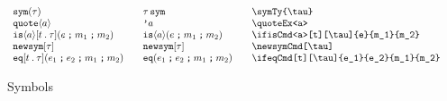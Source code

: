 \documentclass[11pt]{article}
\begin{document}
\begin{figure}
  
  \begin{small}
    \begin{displaymath}
      \begin{array}{l@{\qquad}l@{\qquad}l@{\qquad}l}
        \symTy{\tau}               & \symTy*{\tau}              & \verb|\symTy{\tau}|                \\
        \quoteEx<a>                & \quoteEx*<a>               & \verb|\quoteEx<a>|                 \\
        \ifisCmd<a>[t][\tau]{e}{m_1}{m_2} & \ifisCmd*<a>{e}{m_1}{m_2}  & \verb|\ifisCmd<a>[t][\tau]{e}{m_1}{m_2}| \\
        \newsymCmd[\tau]  & \newsymCmd*[\tau] & \verb|\newsymCmd[\tau]| \\
        \ifeqCmd[t][\tau]{e_1}{e_2}{m_1}{m_2} & \ifeqCmd*{e_1}{e_2}{m_1}{m_2} & \verb|\ifeqCmd[t][\tau]{e_1}{e_2}{m_1}{m_2}| \\
      \end{array}
    \end{displaymath}
  \end{small}

  \caption{Symbols}
  \label{fig:sym}
\end{figure}
\end{document}
